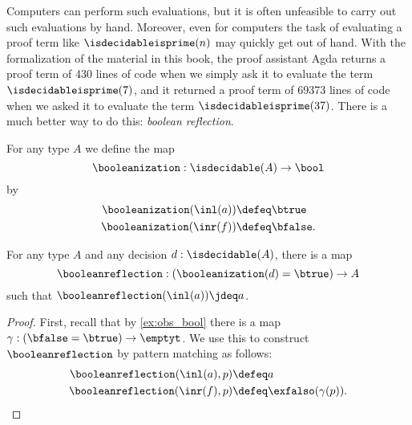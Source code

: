 Computers can perform such evaluations, but it is often unfeasible to carry out such evaluations by hand. Moreover, even for computers the task of evaluating a proof term like $\isdecidableisprime(n)$ may quickly get out of hand. With the formalization of the material in this book, the proof assistant Agda returns a proof term of 430 lines of code when we simply ask it to evaluate the term $\isdecidableisprime(7)$, and it returned a proof term of 69373 lines of code when we asked it to evaluate the term $\isdecidableisprime(37)$. There is a much better way to do this: \emph{boolean reflection}.

\begin{defn}
  For any type $A$ we define the map
  \begin{equation*}
    \booleanization:\isdecidable(A)\to\bool
  \end{equation*}
  by
  \begin{align*}
    \booleanization(\inl(a)) & \defeq \btrue \\*
    \booleanization(\inr(f)) & \defeq \bfalse.
  \end{align*}
\end{defn}

\begin{thm}
  For any type $A$ and any decision $d:\isdecidable(A)$, there is a map
  \begin{equation*}
    \booleanreflection:(\booleanization(d)=\btrue)\to A
  \end{equation*}
  such that $\booleanreflection(\inl(a))\jdeq a$.
\end{thm}

\begin{proof}
  First, recall that by \cref{ex:obs_bool} there is a map $\gamma:(\bfalse=\btrue)\to \emptyt$. We use this to construct $\booleanreflection$ by pattern matching as follows:
  \begin{align*}
    \booleanreflection(\inl(a),p) & \defeq a \\*
    \booleanreflection(\inr(f),p) & \defeq \exfalso(\gamma(p)).\qedhere
  \end{align*}
\end{proof}

